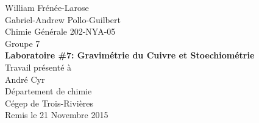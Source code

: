 \begin{titlepage}
\begin{center}
	William Frénée-Larose\\
	Gabriel-Andrew Pollo-Guilbert
	\\[36mm]
	Chimie Générale 202-NYA-05\\
	Groupe 7
	\\[36mm]
	\textbf{Laboratoire \#7: Gravimétrie du Cuivre et Stoechiométrie}
	\\[36mm]
	Travail présenté à\\
	André Cyr
	\\[36mm]
	Département de chimie\\
	Cégep de Trois-Rivières\\
	Remis le 21 Novembre 2015\\
\end{center}
\end{titlepage}
